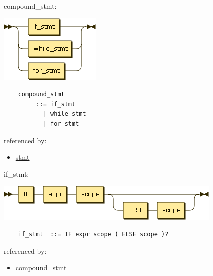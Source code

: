 \begin{minipage}{\textwidth}
    \protect\hypertarget{compound_stmt}{}{compound\_stmt:}

    \includegraphics[width=1.91667in,height=1.29167in]{diagram/compound_stmt.png}

    \begin{verbatim}
    compound_stmt
         ::= if_stmt
           | while_stmt
           | for_stmt
    \end{verbatim}

    referenced by:

    \begin{itemize}
            \tightlist
        \item
            \protect\hyperlink{stmt}{stmt}
    \end{itemize}

\end{minipage}

\begin{minipage}{\textwidth}
    \protect\hypertarget{if_stmt}{}{if\_stmt:}

    \includegraphics[width=4.27083in,height=0.70833in]{diagram/if_stmt.png}

    \begin{verbatim}
    if_stmt  ::= IF expr scope ( ELSE scope )?
    \end{verbatim}

    referenced by:

    \begin{itemize}
            \tightlist
        \item
            \protect\hyperlink{compound_stmt}{compound\_stmt}
    \end{itemize}

\end{minipage}

